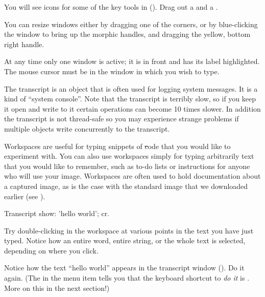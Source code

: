 \documentclass[a4paper,10pt,twoside]{book}
\begin{document}
You will see icons for some of the key tools in \sq ().
Drag out a  and a .

You can resize windows either by dragging one of the corners, or by blue-clicking the window to bring up the morphic handles, and dragging the yellow, bottom right handle.

At any time only one window is active; it is in front and has its label highlighted. The mouse cursor must be in the window in which you wish to type.

The transcript is an object that is often used for logging system messages.
It is a kind of ``system console''.
Note that the transcript is terribly slow, so if you keep it open and write to it certain operations can become 10 times slower.
In addition the transcript is not thread-safe so you may experience strange problems if multiple objects write concurrently to the transcript.

Workspaces are useful for typing snippets of \st code that you would like to experiment with.
You can also use workspaces simply for typing arbitrarily text that you would like to remember, such as to-do lists or instructions for anyone who will use your image.
Workspaces are often used to hold documentation about a captured image, as is the case with the standard image that we downloaded earlier (see ).

\begin{code}{}
Transcript show: 'hello world'; cr.
\end{code}


Try double-clicking in the workspace at various points in the text you have just typed.
Notice how an entire word, entire string, or the whole text is selected, depending on where you click.

Notice how the text ``hello world'' appears in the transcript window
().
Do it again.
(The  in the menu item  tells you that the keyboard shortcut to \emph{do it} is . More on this in the next section!)
\end{document}
